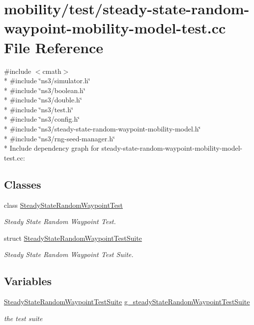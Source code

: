 \hypertarget{steady-state-random-waypoint-mobility-model-test_8cc}{}\section{mobility/test/steady-\/state-\/random-\/waypoint-\/mobility-\/model-\/test.cc File Reference}
\label{steady-state-random-waypoint-mobility-model-test_8cc}
{\ttfamily \#include $<$cmath$>$}\\*
{\ttfamily \#include \char`\"{}ns3/simulator.\+h\char`\"{}}\\*
{\ttfamily \#include \char`\"{}ns3/boolean.\+h\char`\"{}}\\*
{\ttfamily \#include \char`\"{}ns3/double.\+h\char`\"{}}\\*
{\ttfamily \#include \char`\"{}ns3/test.\+h\char`\"{}}\\*
{\ttfamily \#include \char`\"{}ns3/config.\+h\char`\"{}}\\*
{\ttfamily \#include \char`\"{}ns3/steady-\/state-\/random-\/waypoint-\/mobility-\/model.\+h\char`\"{}}\\*
{\ttfamily \#include \char`\"{}ns3/rng-\/seed-\/manager.\+h\char`\"{}}\\*
Include dependency graph for steady-\/state-\/random-\/waypoint-\/mobility-\/model-\/test.cc\+:
\subsection*{Classes}
\begin{DoxyCompactItemize}
\item 
class \hyperlink{classSteadyStateRandomWaypointTest}{Steady\+State\+Random\+Waypoint\+Test}
\begin{DoxyCompactList}\small\item\em Steady State Random Waypoint Test. \end{DoxyCompactList}\item 
struct \hyperlink{structSteadyStateRandomWaypointTestSuite}{Steady\+State\+Random\+Waypoint\+Test\+Suite}
\begin{DoxyCompactList}\small\item\em Steady State Random Waypoint Test Suite. \end{DoxyCompactList}\end{DoxyCompactItemize}
\subsection*{Variables}
\begin{DoxyCompactItemize}
\item 
\hyperlink{structSteadyStateRandomWaypointTestSuite}{Steady\+State\+Random\+Waypoint\+Test\+Suite} \hyperlink{group__mobility-test_ga14b35555884e80f253fef7a55c5b5c21}{g\+\_\+steady\+State\+Random\+Waypoint\+Test\+Suite}
\begin{DoxyCompactList}\small\item\em the test suite \end{DoxyCompactList}\end{DoxyCompactItemize}

